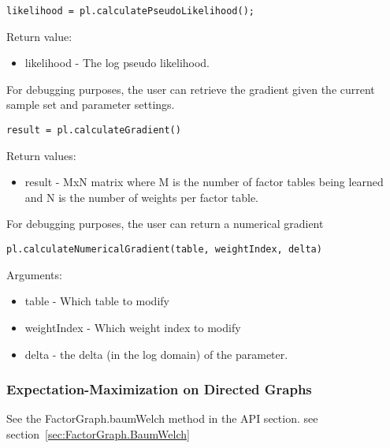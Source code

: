 \begin{lstlisting}
likelihood = pl.calculatePseudoLikelihood();
\end{lstlisting}

Return value:
\begin{itemize}
\item likelihood - The log pseudo likelihood.
\end{itemize}

For debugging purposes, the user can retrieve the gradient given the current sample set and parameter settings.

\begin{lstlisting}
result = pl.calculateGradient()
\end{lstlisting}

Return values:
\begin{itemize}
\item result - MxN matrix where M is the number of factor tables being learned and N is the number of weights per factor table.
\end{itemize}

For debugging purposes, the user can return a numerical gradient

\begin{lstlisting}
pl.calculateNumericalGradient(table, weightIndex, delta)
\end{lstlisting}

Arguments:
\begin{itemize}
\item table - Which table to modify
\item weightIndex - Which weight index to modify
\item delta - the delta (in the log domain) of the parameter.
\end{itemize}



\subsubsection{Expectation-Maximization on Directed Graphs}

See the FactorGraph.baumWelch method in the API section.
see section~\ref{sec:FactorGraph.BaumWelch}

%
%
%
